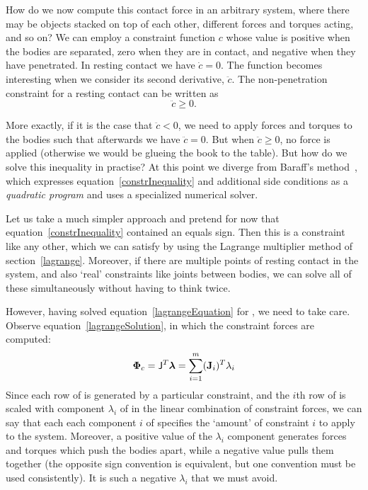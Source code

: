 How do we now compute this contact force in an arbitrary system, where there may be objects stacked
on top of each other, different forces and torques acting, and so on? We can employ a constraint
function $c$ whose value is positive when the bodies are separated, zero when they are in contact,
and negative when they have penetrated. In resting contact we have $\dot{c} = 0$. The function
becomes interesting when we consider its second derivative, $\ddot{c}$. The non-penetration
constraint for a resting contact can be written as
\begin{equation} \label{constrInequality}
\ddot{c} \ge 0.
\end{equation}

More exactly, if it is the case that $\ddot{c} < 0$, we need to apply forces and torques
to the bodies such that afterwards we have $\ddot{c} = 0$. But when
$\ddot{c} \ge 0$, no force is applied (otherwise we would be glueing the book to the
table). But how do we solve this inequality in practise? At this point we diverge from Baraff's
method~\cite{BaraffWitkin:97}, which expresses equation~\ref{constrInequality} and additional
side conditions as a \emph{quadratic program} and uses a specialized numerical solver.

Let us take a much simpler approach and pretend for now that equation~\ref{constrInequality}
contained an equals sign. Then this is a constraint like any other, which we can satisfy by using
the Lagrange multiplier method of section~\ref{lagrange}. Moreover, if there are multiple
points of resting contact in the system, and also `real' constraints like joints between bodies,
we can solve all of these simultaneously without having to think twice.

However, having solved equation~\ref{lagrangeEquation} for \ve{\lambda}, we need to take care.
Observe equation~\ref{lagrangeSolution}, in which the constraint forces are computed:
\begin{equation}
\ve{\Phi}_c = \m{J}^T\ve{\lambda} = \sum_{i=1}^{m} (\ve{J}_i)^T \lambda_i
\end{equation}
Since each row of  is generated by a particular constraint, and the $i$th row of  is
scaled with component $\lambda_i$ of \ve{\lambda} in the linear combination of constraint forces,
we can say that each each component $i$ of \ve{\lambda} specifies the `amount' of constraint $i$
to apply to the system. Moreover, a positive value of the $\lambda_i$ component generates
forces and torques which push the bodies apart, while a negative value pulls them together (the
opposite sign convention is equivalent, but one convention must be used consistently). It is such
a negative $\lambda_i$ that we must avoid.

